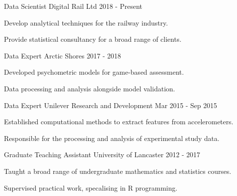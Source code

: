 \begin{cventries}
      
    \cventry
    {Data Scientist}
    {Digital Rail Ltd}
    {}
    {2018 - Present}
    {
      \begin{cvitems}
        \item Develop analytical techniques for the railway industry.
        \item Provide statistical consultancy for a broad range of clients.
      \end{cvitems}
    }  
      
     \cventry
    {Data Expert}
    {Arctic Shores}
    {}
    {2017 - 2018}
    {
      \begin{cvitems}
        \item Developed psychometric models for game-based assessment.
         \item Data processing and analysis alongside model validation.
      \end{cvitems}
    }

  \cventry
    {Data Expert}
    {Unilever Research and Development}
    {}
    {Mar 2015 - Sep 2015}
    {
      \begin{cvitems}
        \item Established computational methods to extract features from accelerometers.
        \item Responsible for the processing and analysis of experimental study data.
      \end{cvitems}
    }
    
    \cventry
    {Graduate Teaching Assistant}
    {University of Lancaster}
    {}
    {2012 - 2017}
    {
      \begin{cvitems}
        \item Taught a broad range of undergraduate mathematics and statistics courses.
         \item Supervised practical work, specalising in R programming.
      \end{cvitems}
    }
\end{cventries}
